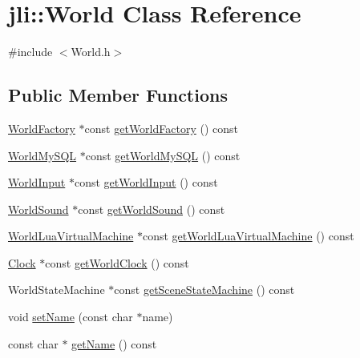 \hypertarget{classjli_1_1_world}{\section{jli\+:\+:World Class Reference}
\label{classjli_1_1_world}
}


{\ttfamily \#include $<$World.\+h$>$}

\subsection*{Public Member Functions}
\begin{DoxyCompactItemize}
\item 
\hyperlink{classjli_1_1_world_factory}{World\+Factory} $\ast$const \hyperlink{classjli_1_1_world_aef4b78708b5daf80703d8a57f2b0f5ae}{get\+World\+Factory} () const 
\item 
\hyperlink{classjli_1_1_world_my_s_q_l}{World\+My\+S\+Q\+L} $\ast$const \hyperlink{classjli_1_1_world_ae8b75d8993a718753d589d49f2c00094}{get\+World\+My\+S\+Q\+L} () const 
\item 
\hyperlink{classjli_1_1_world_input}{World\+Input} $\ast$const \hyperlink{classjli_1_1_world_aeee764fef2643e963d08df7c891f4a26}{get\+World\+Input} () const 
\item 
\hyperlink{classjli_1_1_world_sound}{World\+Sound} $\ast$const \hyperlink{classjli_1_1_world_a00a7fc82c5723b567fa118e029712d34}{get\+World\+Sound} () const 
\item 
\hyperlink{classjli_1_1_world_lua_virtual_machine}{World\+Lua\+Virtual\+Machine} $\ast$const \hyperlink{classjli_1_1_world_a4a11fef67cef6d596344a5f5db79b4fb}{get\+World\+Lua\+Virtual\+Machine} () const 
\item 
\hyperlink{namespacejli_af69056b00744493ba074ef13e82b0bec}{Clock} $\ast$const \hyperlink{classjli_1_1_world_a4e35bb1d091a72f667de5c4cbc6e04b8}{get\+World\+Clock} () const 
\item 
World\+State\+Machine $\ast$const \hyperlink{classjli_1_1_world_a38bea1462eb2aa602938b5c03f92e4ad}{get\+Scene\+State\+Machine} () const 
\item 
void \hyperlink{classjli_1_1_world_aaa89d822b116f5b8fcf81a87c44b5c2d}{set\+Name} (const char $\ast$name)
\item 
const char $\ast$ \hyperlink{classjli_1_1_world_a14533a04f69a15a775df34d3d322f7bd}{get\+Name} () const 
\end{DoxyCompactItemize}
